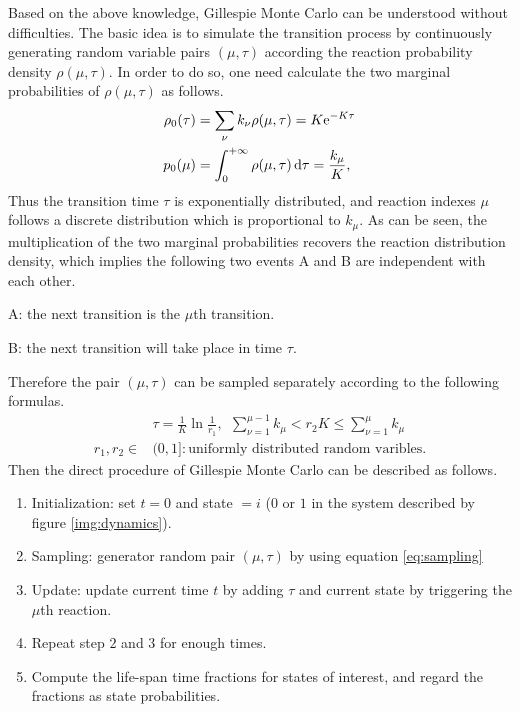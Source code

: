 		Based on the above knowledge, Gillespie Monte Carlo can be understood without difficulties. The basic idea is to simulate the transition process by continuously generating random variable pairs $(\mu, \tau)$ according the reaction probability density $\rho(\mu,\tau)$. In order to do so, one need calculate the two marginal probabilities of $\rho(\mu,\tau)$ as follows.
		\begin{equation}
			\begin{aligned}
				\rho_0(\tau) &= \sum_\nu k_\nu \rho(\mu,\tau) = K\mathrm{e}^{-K\tau}\\
				p_0(\mu) &= \int_0^{+\infty}\rho(\mu,\tau)\operatorname{d\!} \tau = \frac{k_\mu}{K},
			\end{aligned}
			\label{eq: marginal_distribution}
		\end{equation}
		Thus the transition time $\tau$ is exponentially distributed, and reaction indexes $\mu$ follows a discrete distribution which is proportional to $k_\mu$. As can be seen, the multiplication of the two marginal probabilities recovers the reaction distribution density, which implies the following two events A and B are independent with each other.
		\begin{description}
			\item A: the next transition is the $\mu$th transition.
			\item B: the next transition will take place in time $\tau$.
		\end{description}
		Therefore the pair $(\mu, \tau)$ can be sampled separately according to the following formulas.
		\begin{equation}
			\begin{aligned}
			&\tau = \frac{1}{K}\ln{\frac{1}{r_1}}, \ \ 
			\sum_{\nu=1}^{\mu-1} k_\mu <r_2K \le \sum_{\nu=1}^{\mu} k_\mu\\
			r_1,r_2 \in &(0,1]: \text{uniformly distributed random varibles.}
			\end{aligned}
			\label{eq:sampling}
		\end{equation}
		Then the direct procedure of Gillespie Monte Carlo can be described as follows.
		\begin{enumerate}
			\item Initialization: set $t = 0$ and state $=i$ ($0$ or $1$ in the system described by figure \ref{img:dynamics}).
			\item Sampling: generator random pair $(\mu, \tau)$ by using equation \eqref{eq:sampling}
			\item Update: update current time $t$ by adding $\tau$ and current state by triggering the $\mu$th reaction.
			\item Repeat step $2$ and $3$ for enough times.
			\item Compute the life-span time fractions for states of interest, and regard the fractions as state probabilities.
		\end{enumerate}

